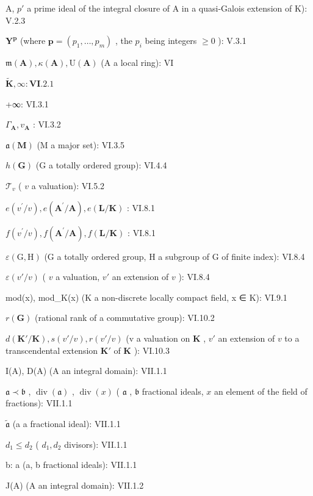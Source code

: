 A, \(p'\) a prime ideal of the integral closure of A in a quasi-Galois extension of K): V.2.3

\(\mathbf{Y}^{\mathbf{p}}\) (where \(\mathbf{p} = (p_1, \ldots, p_m)\) , the \(p_i\) being integers \(\geqslant 0\) ): V.3.1

\(\mathfrak{m}(\mathbf{A}), \kappa(\mathbf{A}), \mathrm{U}(\mathbf{A})\) (A a local ring): VI

\(\tilde{\mathbf{K}},\infty :\mathbf{VI}.2.1\)

+∞: VI.3.1

\(\Gamma_{\mathbf{A}}, v_{\mathbf{A}}\) : VI.3.2

\(\mathfrak{a}(\mathbf{M})\) (M a major set): VI.3.5

\(h(\mathbf{G})\) (G a totally ordered group): VI.4.4

\(\mathcal{T}_v\) ( \(v\) a valuation): VI.5.2

\(e(v^{\prime} / v), e(\mathbf{A}^{\prime} / \mathbf{A}), e(\mathbf{L} / \mathbf{K})\) : VI.8.1

\(f(v^{\prime} / v),f(\mathbf{A}^{\prime} / \mathbf{A}),f(\mathbf{L} / \mathbf{K})\) : VI.8.1

\(\varepsilon (\mathrm{G},\mathrm{H})\) (G a totally ordered group, H a subgroup of G of finite index): VI.8.4

\(\varepsilon(v'/v)\) ( \(v\) a valuation, \(v'\) an extension of \(v\) ): VI.8.4

mod(x), mod\_K(x) (K a non-discrete locally compact field, x ∈ K): VI.9.1

\(r(\mathbf{G})\) (rational rank of a commutative group): VI.10.2

\(d(\mathbf{K}' / \mathbf{K}), s(v' / v), r(v' / v)\) (v a valuation on \(\mathbf{K}\) , \(v'\) an extension of \(v\) to a transcendental extension \(\mathbf{K}'\) of \(\mathbf{K}\) ): VI.10.3

I(A), D(A) (A an integral domain): VII.1.1

\(\mathfrak{a} \prec \mathfrak{b}\) , \(\operatorname{div}(\mathfrak{a})\) , \(\operatorname{div}(x)\) ( \(\mathfrak{a}\) , \(\mathfrak{b}\) fractional ideals, \(x\) an element of the field of fractions): VII.1.1

\(\tilde{\mathfrak{a}}\) (a a fractional ideal): VII.1.1

\(d_{1} \leqslant d_{2}\) ( \(d_{1}, d_{2}\) divisors): VII.1.1

b: a (a, b fractional ideals): VII.1.1

J(A) (A an integral domain): VII.1.2

